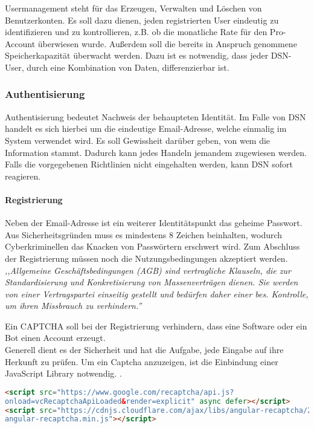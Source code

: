 
Usermanagement steht für das Erzeugen, Verwalten und Löschen von Benutzerkonten. Es soll dazu dienen, jeden registrierten User eindeutig zu identifizieren und zu kontrollieren, z.B. ob die monatliche Rate für den Pro-Account überwiesen wurde. Außerdem soll die bereits in Anspruch genommene Speicherkapazität überwacht werden. Dazu ist es notwendig, dass jeder DSN-User, durch eine Kombination von Daten, differenzierbar ist.
\subsubsection{Authentisierung}
Authentisierung bedeutet Nachweis der behaupteten Identität. Im Falle von DSN handelt es sich hierbei um die eindeutige Email-Adresse, welche einmalig im System verwendet wird. Es soll Gewissheit darüber geben, von wem die Information stammt. Dadurch kann jedes Handeln jemandem zugewiesen werden. Falls die vorgegebenen Richtlinien nicht eingehalten werden, kann DSN sofort reagieren.
\paragraph{Registrierung}
Neben der Email-Adresse ist ein weiterer Identitätspunkt das geheime Passwort. Aus Sicherheitsgründen muss es mindestens 8 Zeichen beinhalten, wodurch Cyberkriminellen das Knacken von Passwörtern erschwert wird. Zum Abschluss der Registrierung müssen noch die Nutzungsbedingungen akzeptiert werden.\\
\textit{,,Allgemeine Geschäftsbedingungen (AGB) sind vertragliche Klauseln, die zur Standardisierung und Konkretisierung von Massenverträgen dienen. Sie werden von einer Vertragspartei einseitig gestellt und bedürfen daher einer bes. Kontrolle, um ihren Missbrauch zu verhindern.''}\cite{AGB}\\
\cite{VERTEILTE_SYSTEME}\cite{PASSWORT_SCHUTZ}


\newpage

Ein CAPTCHA soll bei der Registrierung verhindern, dass eine Software oder ein Bot einen Account erzeugt.\\
Generell dient es der Sicherheit und hat die Aufgabe, jede Eingabe auf ihre Herkunft zu prüfen. Um ein Captcha anzuzeigen, ist die Einbindung einer JavaScript Library notwendig. \cite{CAPTCHA}.
\begin{lstlisting}[caption={Einbindung der JS-Library Recaptcha}, language=HTML]
<script src="https://www.google.com/recaptcha/api.js?
onload=vcRecaptchaApiLoaded&render=explicit" async defer></script>
<script src="https://cdnjs.cloudflare.com/ajax/libs/angular-recaptcha/2.2.5/
angular-recaptcha.min.js"></script>
\end{lstlisting}

